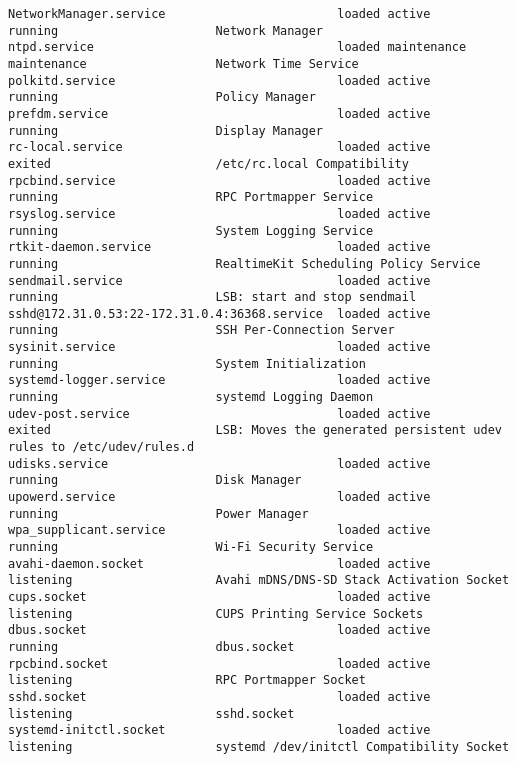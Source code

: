 \documentclass[titlepage]{article}
\begin{document}
\begin{lstlisting}
NetworkManager.service                        loaded active       running                      Network Manager
ntpd.service                                  loaded maintenance  maintenance                  Network Time Service
polkitd.service                               loaded active       running                      Policy Manager
prefdm.service                                loaded active       running                      Display Manager
rc-local.service                              loaded active       exited                       /etc/rc.local Compatibility
rpcbind.service                               loaded active       running                      RPC Portmapper Service
rsyslog.service                               loaded active       running                      System Logging Service
rtkit-daemon.service                          loaded active       running                      RealtimeKit Scheduling Policy Service
sendmail.service                              loaded active       running                      LSB: start and stop sendmail
sshd@172.31.0.53:22-172.31.0.4:36368.service  loaded active       running                      SSH Per-Connection Server
sysinit.service                               loaded active       running                      System Initialization
systemd-logger.service                        loaded active       running                      systemd Logging Daemon
udev-post.service                             loaded active       exited                       LSB: Moves the generated persistent udev rules to /etc/udev/rules.d
udisks.service                                loaded active       running                      Disk Manager
upowerd.service                               loaded active       running                      Power Manager
wpa_supplicant.service                        loaded active       running                      Wi-Fi Security Service
avahi-daemon.socket                           loaded active       listening                    Avahi mDNS/DNS-SD Stack Activation Socket
cups.socket                                   loaded active       listening                    CUPS Printing Service Sockets
dbus.socket                                   loaded active       running                      dbus.socket
rpcbind.socket                                loaded active       listening                    RPC Portmapper Socket
sshd.socket                                   loaded active       listening                    sshd.socket
systemd-initctl.socket                        loaded active       listening                    systemd /dev/initctl Compatibility Socket

\end{lstlisting}
\end{document}
